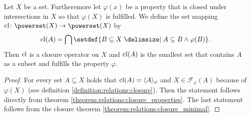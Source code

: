 \begin{theorem}\label{theorem:mappings:closure_operator}
    Let $X$ be a set. Furtheremore let $\varphi(x)$ be a property that is closed under intersections in $X$ so that $\varphi(X)$ is fulfilled. We define the set mapping $\clop\colon\powerset(X)\rightarrow\powerset(X)$ by
    \begin{align}\clop(A)=\bigcap\setdef{B\subseteq X\given A\subseteq B\land \varphi(B)}.\end{align}
    Then $\text{cl}$ is a closure operator on $X$ and $\text{cl}(A)$ is the smallest set that contains $A$ as a subset and fulfills the property $\varphi$.
\end{theorem}
\begin{proof}
    For every set $A\subseteq X$ holds that $\text{cl}(A)=\langle A\rangle_\varphi$ and $X\in\mathcal F_\varphi(A)$ because of $\varphi(X)$ (see definition \ref{definition:relations:closure}). Then the statement follows directly from theorem \ref{theorem:relations:closure_properties}. The last statement follows from the closure theorem \ref{theorem:relations:closure_minimal}.
\end{proof}

\newcommand\chainset{\mathcal C}

